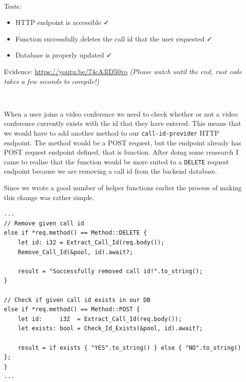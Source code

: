 {\color{gray} \hrulefill} \\ \vspace{0.2cm}

{\sffamily Tests:}

\begin{itemize}
\item HTTP endpoint is accessible \faCheck \\
\item Function successfully deletes the call id that the user requested \faCheck \\
\item Database is properly updated \faCheck \\
\end{itemize}

{\sffamily Evidence:} \url{https://youtu.be/74cA3lD50vo}
\textit{(Please watch until the end, rust code takes a
few seconds to compile!)}

{\color{gray} \hrulefill} \\ \vspace{0.2cm}

When a user joins a video conference we need to check whether or
not a video conference currently exists with the id that they
have entered. This means that we would have to add another
method to our \texttt{call-id-provider} HTTP endpoint. The
method would be a POST request, but the endpoint already has
POST request endpoint defined, that is 
function. After doing some reasearch I came to realise that
the  function would be more suited to
a \texttt{DELETE} request endpoint because we are removing a
call id from the backend database. \\ \vspace{0.2cm}

Since we wrote a good number of helper functions earlier the
process of making this change was rather simple.

\begin{verbatim}
...
// Remove given call id
else if *req.method() == Method::DELETE {
    let id: i32 = Extract_Call_Id(req.body());
    Remove_Call_Id(&pool, id).await?;

    result = "Successfully removed call id!".to_string();
}

// Check if given call id exists in our DB
else if *req.method() == Method::POST {
    let id:     i32  = Extract_Call_Id(req.body());
    let exists: bool = Check_Id_Exists(&pool, id).await?;

    result = if exists { "YES".to_string() } else { "NO".to_string() };
}
...
\end{verbatim}

